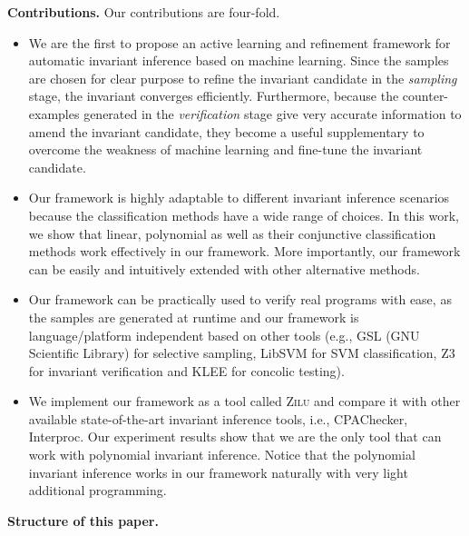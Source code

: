 \medskip\noindent
\textbf{Contributions.}
Our contributions are four-fold. 
\begin{itemize}
    \item 
    We are the first to propose an active learning and refinement framework 
    for automatic invariant inference based on machine learning. 
    Since the samples are chosen for clear purpose 
    to refine the invariant candidate in the \emph{sampling} stage, 
    the invariant converges efficiently. 
    Furthermore, because the counter-examples generated in the \emph{verification} stage 
    give very accurate information to amend the invariant candidate, 
    they become a useful supplementary to overcome the weakness of machine learning 
    and fine-tune the invariant candidate. 
    \item 
    Our framework is highly adaptable to different invariant inference scenarios 
    because the classification methods have a wide range of choices. 
    In this work, we show that linear, polynomial as well as 
    their conjunctive classification methods work effectively in our framework. 
    More importantly, our framework can be easily and intuitively extended with other alternative methods. 
    \item 
    Our framework can be practically used to verify real programs with ease, 
    as the samples are generated at runtime 
    and our framework is language/platform independent based on other tools 
    (e.g., GSL (GNU Scientific Library)\cite{gough2009gnu} for selective sampling, LibSVM\cite{chang2011libsvm} for SVM classification, 
    Z3\cite{de2008z3} for invariant verification and KLEE\cite{cadar2008klee} for concolic testing). 
    \item 
    We implement our framework as a tool called \textsc{Zilu} 
    and compare it with other available state-of-the-art invariant inference tools, 
    i.e., CPAChecker, Interproc. 
    Our experiment results show that 
    we are the only tool that can work with polynomial invariant inference. 
    Notice that the polynomial invariant inference works in our framework 
    naturally with very light additional programming. 
\end{itemize}

\medskip\noindent
\textbf{Structure of this paper.}

